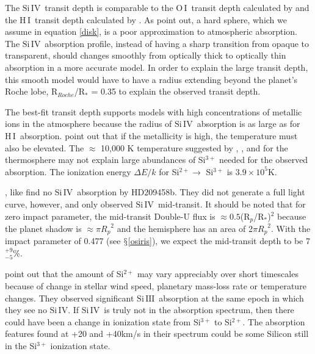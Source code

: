 \documentclass[manuscript]{aastex}
\newcommand{\oi}{\ensuremath{\mathrm{O}\,\scriptstyle \mathrm{I}}}
\newcommand{\hi}{\ensuremath{\mathrm{H}\,\scriptstyle \mathrm{I}}}
\newcommand{\siIV}{\ensuremath{\mathrm{Si}\,\scriptstyle \mathrm{IV}}}
\newcommand{\siIII}{\ensuremath{\mathrm{Si}\,\scriptstyle \mathrm{III}}}
\newcommand{\p}{R$_p$/R$_*$}
\newcommand{\lya}{Lyman-$\alpha$}
\begin{document}
The \siIV\ transit depth is comparable to the \oi\ transit depth calculated by \citet{vidmad} and the \hi\ transit depth calculated by \citet{benjaf7}. As \citet{kosk} point out, a hard sphere, which we assume in equation \ref{disk}, is a poor approximation to atmospheric absorption. The \siIV\ absorption profile, instead of having a sharp transition from opaque to transparent, should changes smoothly from optically thick to optically thin absorption in a more accurate model. In order to explain the large transit depth, this smooth model would have to have a radius extending beyond the planet's Roche lobe, R$_{Roche}$/R$_*$ = 0.35 \citep{ben10} to explain the observed transit depth.

The best-fit transit depth supports models with high concentrations of metallic ions in the atmosphere because the radius of \siIV\ absorption is as large as for \hi\ absorption. \citet{kosk} point out that if the metallicity is high, the temperature must also be elevated. The $\approx$ 10,000 K temperature suggested by \citet{gmunoz}, \citet{mclay}, and \citet{kosk} for the thermosphere may not explain large abundances of Si$^{3+}$ needed for the observed absorption. The ionization energy $\Delta E/k$ for Si$^{2+} \rightarrow$ Si$^{3+}$ is $3.9 \times 10^5$K.


\citet{linsky}, like \citet{vidmad} find no \siIV\ absorption by HD209458b. They did not generate a full light curve, however, and only observed \siIV\ mid-transit. It should be noted that for zero impact parameter, the mid-transit Double-U flux is $\approx 0.5 $(\p)$^2$ because the planet shadow is $\approx \pi {R_p}^2$ and the hemisphere has an area of 2$\pi {R_p}^2$. With the impact parameter of 0.477 (see $\mathsection$\ref{osiris}), we expect the mid-transit depth to be  7$^{+9}_{-5}$\%. 

\citet{linsky} point out that the amount of Si$^{2+}$ may vary appreciably over short timescales because of change in stellar wind speed, planetary mass-loss rate or temperature changes. They observed significant \siIII\ absorption at the same epoch in which they see no \siIV. If \siIV\ is truly not in the absorption spectrum, then there could have been a change in ionization state from Si$^{3+}$ to Si$^{2+}$. The absorption features found at +20 and +40km/s in their spectrum could be some 
Silicon still in the Si$^{3+}$ ionization state.
\end{document}

